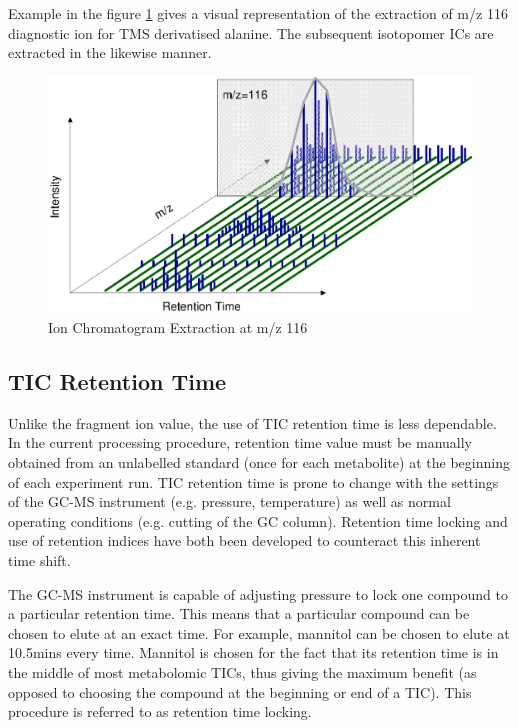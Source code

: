 Example in the figure \ref{fig:82} gives a visual representation of the 
extraction of m/z 116 diagnostic ion for TMS derivatised alanine. The 
subsequent isotopomer ICs are extracted in the likewise manner.

\begin{figure}
  \begin{center}
    \includegraphics[scale=0.7]{graphics/chapter08/82.eps}
  \end{center}
  \caption{Ion Chromatogram Extraction at m/z 116}
  \label{fig:82}
\end{figure}

\subsection{TIC Retention Time}

Unlike the fragment ion value, the use of TIC retention time is less dependable. 
In the current processing procedure, retention time value must be manually 
obtained from an unlabelled standard (once for each metabolite) at the 
beginning of each experiment run. TIC retention time is prone to change with 
the settings of the GC-MS instrument (e.g. pressure, temperature) as well as 
normal operating conditions (e.g. cutting of the GC column). Retention time 
locking and use of retention indices have both been developed to counteract 
this inherent time shift. 

The GC-MS instrument is capable of adjusting pressure to lock one compound to a 
particular retention time. This means that a particular compound can be chosen 
to elute at an exact time. For example, mannitol can be chosen to elute 
at 10.5mins every time. Mannitol is chosen for the fact that its retention time 
is in the middle of most metabolomic TICs, thus giving the maximum benefit (as 
opposed to choosing the compound at the beginning or end of a TIC). This 
procedure is referred to as retention time locking.

